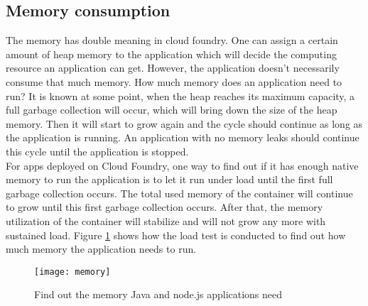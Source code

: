 \subsection{Memory consumption}
The memory has double meaning in cloud foundry. One can assign a certain amount of heap memory to the application which will decide the computing resource an application can get. However, the application doesn't necessarily consume that much memory. How much memory does an application need to run? It is known at some point, when the heap reaches its maximum capacity, a full garbage collection will occur, which will bring down the size of the heap memory. Then it will start to grow again and the cycle should continue as long as the application is running. An application with no memory leaks should continue this cycle until the application is stopped. \\
For apps deployed on Cloud Foundry, one way to find out if it has enough native memory to run the application is to let it run under load until the first full garbage collection occurs. The total used memory of the container will continue to grow until this first garbage collection occurs. After that, the memory utilization of the container will stabilize and will not grow any more with sustained load. Figure \ref{memory} shows how the load test is conducted to find out how much memory the application needs to run. 

\begin{figure}[h]
	\centering
	\texttt{[image: memory]}
	\caption{Find out the memory Java and node.js applications need }
	\label{memory}
\end{figure}

